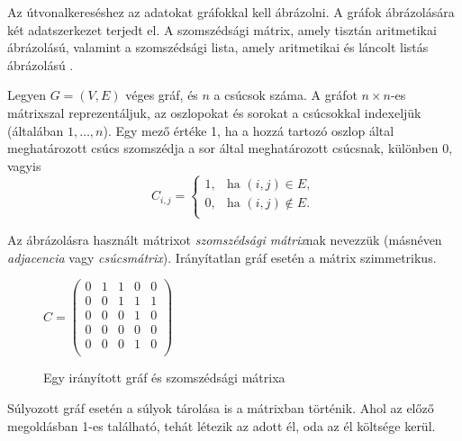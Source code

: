 

Az útvonalkereséshez az adatokat gráfokkal kell ábrázolni. A gráfok ábrázolására két adatszerkezet terjedt el. A szomszédsági mátrix, amely tisztán aritmetikai ábrázolású, valamint a szomszédsági lista, amely aritmetikai és láncolt listás ábrázolású \cite{grafabrazolas}.


Legyen $G = (V,E)$ véges gráf, és $n$ a csúcsok száma. A gráfot $n \times n$-es mátrixszal reprezentáljuk, az oszlopokat és sorokat a csúcsokkal indexeljük (általában $1, \ldots, n$). Egy mező értéke 1, ha a hozzá tartozó oszlop által meghatározott csúcs szomszédja a sor által meghatározott csúcsnak, különben 0, vagyis
$$
C_{i, j} = \begin{cases}
    1, & \text{ha } (i, j) \in E, \\
    0, & \text{ha } (i, j) \notin E. \\
\end{cases}
$$

Az ábrázolásra használt mátrixot \textit{szomszédsági mátrix}nak nevezzük (másnéven \textit{adjacencia} vagy \textit{csúcsmátrix}). Irányítatlan gráf esetén a mátrix szimmetrikus.

\begin{figure}
\centering
\begin{minipage}{.5\textwidth}
    \centering
    
\end{minipage}\begin{minipage}{.5\textwidth}
    \centering
$
C =
\left(
\begin{array}{ccccc}
0 & 1 & 1 & 0 & 0 \\
0 & 0 & 1 & 1 & 1 \\
0 & 0 & 0 & 1 & 0 \\
0 & 0 & 0 & 0 & 0 \\
0 & 0 & 0 & 1 & 0 \\
\end{array}
\right)
$
\end{minipage}
\caption{Egy irányított gráf és szomszédsági mátrixa}
\label{fig:szomszedsagi_graf_matrix}
\end{figure}

Súlyozott gráf esetén a súlyok tárolása is a mátrixban történik. Ahol az előző megoldásban 1-es található, tehát létezik az adott él, oda az él költsége kerül.

